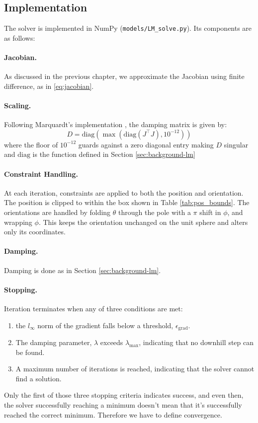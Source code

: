 \subsection{Implementation}
The solver is implemented in NumPy (\lstinline[style=python]|models/LM_solve.py|). Its components are as follows:

\paragraph{Jacobian.} As discussed in the previous chapter, we approximate the Jacobian using finite difference, as in \eqref{eq:jacobian}.

\paragraph{Scaling.} Following Marquardt's implementation \cite{marquardt1963}, the damping matrix is given by:
\begin{equation}
  D = \text{diag}(\max(\text{diag}(J^\top J), 10^{-12}))
\end{equation}
where the floor of $10^{-12}$ guards against a zero diagonal entry making $D$ singular and $\text{diag}$ is the function defined in Section \ref{sec:background-lm}

\paragraph{Constraint Handling.} At each iteration, constraints are applied to both the position and orientation. The position is clipped to within the box shown in Table \ref{tab:pos_bounds}. The orientations are handled by folding $\theta$ through the pole with a $\pi$ shift in $\phi$, and wrapping $\phi$. This keeps the orientation unchanged on the unit sphere and alters only its coordinates.

\paragraph{Damping.} Damping is done as in Section \ref{sec:background-lm}.

\paragraph{Stopping.} Iteration terminates when any of three conditions are met:
\begin{enumerate}
  \item the $l_{\infty}$ norm of the gradient falls below a threshold, $\epsilon_{\mathrm{grad}}$.
  \item The damping parameter, $\lambda$ exceeds $\lambda_{\mathrm{max}}$, indicating that no downhill step can be found. 
  \item A maximum number of iterations is reached, indicating that the solver cannot find a solution.
\end{enumerate}
Only the first of those three stopping criteria indicates success, and even then, the solver successfully reaching a minimum doesn't mean that it's successfully reached the correct minimum. Therefore we have to define convergence.

